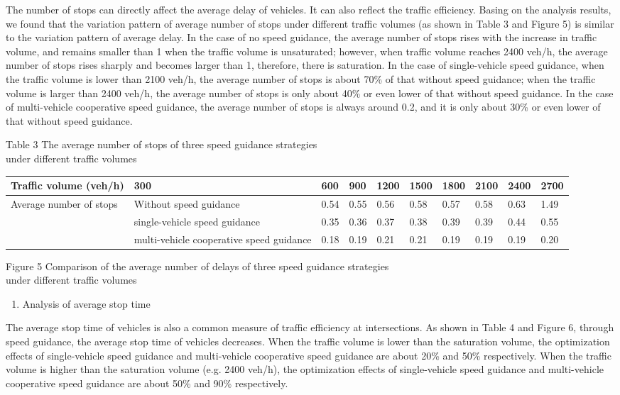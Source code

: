 The number of stops can directly affect the average delay of vehicles.
It can also reflect the traffic efficiency. Basing on the analysis
results, we found that the variation pattern of average number of stops
under different traffic volumes (as shown in Table 3 and Figure 5) is
similar to the variation pattern of average delay. In the case of no
speed guidance, the average number of stops rises with the increase in
traffic volume, and remains smaller than 1 when the traffic volume is
unsaturated; however, when traffic volume reaches 2400 veh/h, the
average number of stops rises sharply and becomes larger than 1,
therefore, there is saturation. In the case of single-vehicle speed
guidance, when the traffic volume is lower than 2100 veh/h, the average
number of stops is about 70\% of that without speed guidance; when the
traffic volume is larger than 2400 veh/h, the average number of stops is
only about 40\% or even lower of that without speed guidance. In the
case of multi-vehicle cooperative speed guidance, the average number of
stops is always around 0.2, and it is only about 30\% or even lower of
that without speed guidance.

Table 3 The average number of stops of three speed guidance strategies\\
under different traffic volumes

\begin{longtable}[c]{@{}llllllllll@{}}
\toprule
Traffic volume (veh/h) & 300 & 600 & 900 & 1200 & 1500 & 1800 & 2100 &
2400 & 2700\tabularnewline
\midrule
\endhead
Average number of stops & Without speed guidance & 0.54 & 0.55 & 0.56 &
0.58 & 0.57 & 0.58 & 0.63 & 1.49\tabularnewline
& single-vehicle speed guidance & 0.35 & 0.36 & 0.37 & 0.38 & 0.39 &
0.39 & 0.44 & 0.55\tabularnewline
& multi-vehicle cooperative speed guidance & 0.18 & 0.19 & 0.21 & 0.21 &
0.19 & 0.19 & 0.19 & 0.20\tabularnewline
\bottomrule
\end{longtable}

Figure 5 Comparison of the average number of delays of three speed
guidance strategies\\
under different traffic volumes

\begin{enumerate}
\def\labelenumi{\arabic{enumi})}
\item
  Analysis of average stop time
\end{enumerate}

The average stop time of vehicles is also a common measure of traffic
efficiency at intersections. As shown in Table 4 and Figure 6, through
speed guidance, the average stop time of vehicles decreases. When the
traffic volume is lower than the saturation volume, the optimization
effects of single-vehicle speed guidance and multi-vehicle cooperative
speed guidance are about 20\% and 50\% respectively. When the traffic
volume is higher than the saturation volume (e.g. 2400 veh/h), the
optimization effects of single-vehicle speed guidance and multi-vehicle
cooperative speed guidance are about 50\% and 90\% respectively.

